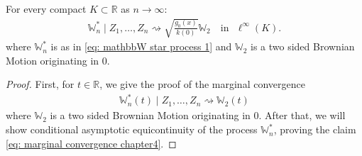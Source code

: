 \begin{lemma}\label{lemma: conditional convergence W star}
For every compact $K \subset \mathbb{R}$ as $n \to \infty$:
\begin{align}\label{eq: marginal convergence chapter4}
	\mathbb{W}_n^*\mid Z_1, \dots, Z_n \rightsquigarrow \sqrt{\frac{g_0(x)}{k(0)}} \mathbb{W}_2 \quad \text{in } \, \, \ell^\infty(K).
\end{align}
where $\mathbb{W}_n^*$ is as in \eqref{eq: mathbbW star process 1} and $\mathbb{W}_2$ is a two sided Brownian Motion originating in $0$.
\end{lemma}
\begin{proof}
First, for $t \in \mathbb{R}$, we give the proof of the marginal convergence 
\begin{align}\label{eq: first marginal convergence}
    \mathbb{W}_n^*(t) \mid Z_1, \ldots, Z_n \rightsquigarrow \mathbb{W}_2(t)
\end{align}
where $\mathbb{W}_2$ is a two sided Brownian Motion originating in $0$. After that, we will show conditional asymptotic equicontinuity of the process $\mathbb{W}_n^*$, proving the claim \eqref{eq: marginal convergence chapter4}.


\end{proof}

